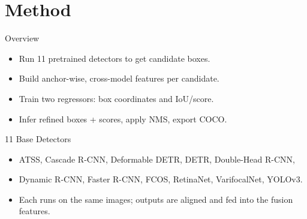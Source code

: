 \documentclass[aspectratio=169]{beamer}
\begin{document}
\section{Method}

\begin{frame}{Overview}
  \begin{itemize}
    \item Run 11 pretrained detectors to get candidate boxes.
    \item Build \alert{anchor-wise, cross-model features} per candidate.
    \item Train two regressors: \alert{box coordinates} and \alert{IoU/score}.
    \item Infer refined boxes + scores, apply \alert{NMS}, export COCO.
  \end{itemize}
\end{frame}

\begin{frame}{11 Base Detectors}
  \begin{itemize}
    \item ATSS, Cascade R-CNN, Deformable DETR, DETR, Double-Head R-CNN,
    \item Dynamic R-CNN, Faster R-CNN, FCOS, RetinaNet, VarifocalNet, YOLOv3.
    \item Each runs on the same images; outputs are aligned and fed into the fusion features.
  \end{itemize}
\end{frame}
\end{document}
